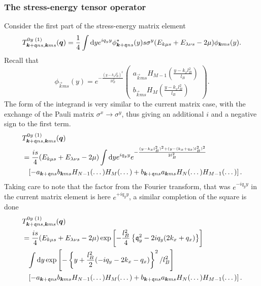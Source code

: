 \subsubsection{The stress-energy tensor operator}
Consider the first part of the stress-energy matrix element
\begin{equation}
\label{eq:24}
T^{0y \;(1)}_{\bm{k}+\mathfrak{q}ns, \bm{k}ms} (\bm{q})
=
\frac{1}{4}
\int \mathrm{d}y e^{iq_y y}
\phi ^* _{\bm{k}+\mathfrak{q} ns}(y) s \sigma ^y (E_{k \mu s} + E_{\lambda \nu s}- 2\mu )
\phi _{\bm{k} ms}(y).
\end{equation}
Recall that 
\begin{equation}
  \phi _{\vec{k}ms}(y) =
  e^{- \frac{(y - k_x l_B ^2)^2}{2 l_B^2}}
  \begin{pmatrix}
    a_{\vec{k} ms} H_{M-1} \left( \frac{y-k_x l_B^2}{l_B} \right)\\
    b_{\vec{k} ms} H_M \left( \frac{y - k_x l_B^2}{l_B} \right)
  \end{pmatrix}.
\end{equation}
The form of the integrand is very similar to the current matrix case, with the exchange of the Pauli matrix $\sigma ^x \to \sigma ^y$, thus giving an additional $i$ and a negative sign to the first term.
\begin{align}
&T^{0y \;(1)}_{\bm{k}+\mathfrak{q}ns, \bm{k}ms} (\bm{q})\\
  \nonumber &= \frac{i s}{4}
    (E_{k \mu s} + E_{\lambda \nu s}- 2\mu )
    \int \mathrm{d}y e^{iq_y y} e^{- \frac{(y-k_xl_B^2)^2 + (y-(k_x + q_x) l_B^2)^2}{2 l_B^2}}\\
    \nonumber & \phantom{=} \left[
    - a_{\bm{k}+\mathfrak{q} ns} b_{\bm{k} ms} H_{N-1} (\dots ) H_M(\dots )
    + b_{\bm{k}+\mathfrak{q} ns} a_{\bm{k}ms} H_N(\dots ) H_{M-1}(\dots )
    \right].
\end{align}
Taking care to note that the factor from the Fourier transform, that was $e^{-iq_y y}$ in the current matrix element is here $e^{+ i q_y y}$, a similar completion of the square is done 
\begin{equation}
  \begin{split}
    &T^{0y \;(1)}_{\bm{k}+\mathfrak{q}ns, \bm{k}ms} (\bm{q})\\
    &=
    \frac{i s}{4}
    (E_{k \mu s} + E_{\lambda \nu s}- 2\mu )
    \exp \left[
      -\frac{l_B^2}{4} \left\{ \mathfrak{q}_y^2 - 2 i q_y (2 k_x + q_x) \right\}
    \right]\\
    &\phantom{=} \int \mathrm{d}y
    \exp \left[
      -\left\{ y + \frac{l_B^2}{2} (-iq_y - 2 k_x - q_x) \right\}^2 / l_B^2
    \right]\\
    &\phantom{=} \left[
      - a_{\bm{k}+\mathfrak{q} ns} b_{\bm{k} ms} H_{N-1} (\dots ) H_M(\dots )
      + b_{\bm{k}+\mathfrak{q} ns} a_{\bm{k}ms} H_N(\dots ) H_{M-1}(\dots )
    \right].
  \end{split}
\end{equation}
